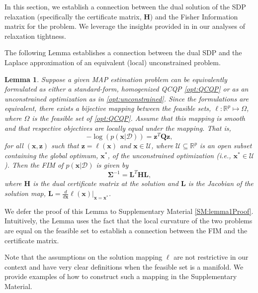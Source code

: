 \documentclass[lettersize,journal]{IEEEtran}
\newtheorem{lemma}[theorem]{Lemma}
\begin{document}
{In this section, we establish a connection between the dual solution of the SDP relaxation (specifically the certificate matrix, $\bm{H}$) and the Fisher Information matrix for the problem. We leverage the insights provided in \cite{zhangDegeneracyOptimizationbasedState2016} in our analyses of relaxation tightness. 

The following Lemma establishes a connection between the dual SDP and the Laplace approximation of an equivalent (local) unconstrained problem. 

\begin{lemma}\label{thm:FisherInfo}
	Suppose a given MAP estimation problem can be equivalently formulated as either a standard-form, homogenized QCQP \eqref{opt:QCQP} or as an unconstrained optimization as in \eqref{opt:unconstrained}. Since the formulations are equivalent, there exists a bijective mapping between the feasible sets, $\bm{\ell}: \mathbb{R}^p \mapsto \Omega$, where $\Omega$ is the feasible set of \eqref{opt:QCQP}. Assume that this mapping is smooth and that respective objectives are locally equal under the mapping. That is,
	\begin{equation}
		-\log\left(p(\bm{x} \vert \bm{\mathcal{D}})\right) = \bm{z}^T \bm{Q} \bm{z},
	\end{equation}
	for all $(\bm{x}, \bm{z})$ such that $\bm{z}=\mathbb{\ell}(\bm{x})$ and $\bm{x} \in \mathcal{U}$, where $\mathcal{U} \subseteq \mathbb{R}^p$ is an open subset containing the global optimum, $\bm{x}^*$, of the unconstrained optimization (i.e., $\bm{x}^* \in \mathcal{U}$). Then the FIM of $p(\bm{x} \vert \bm{\mathcal{D}})$ is given by
	\begin{equation}
		\bm{\Sigma}^{-1}= \bm{L}^T \bm{H}\bm{L},
	\end{equation}
	where $\bm{H}$ is the dual certificate matrix at the solution and $\bm{L}$ is the Jacobian of the solution map, $\bm{L} = \frac{d}{d\bm{x}}\bm{\ell}(\bm{x})\vert_{\bm{x}=\bm{x}^*}$. 
\end{lemma}

We defer the proof of this Lemma to Supplementary Material \ref{SM:lemma1Proof}. Intuitively, the Lemma uses the fact that the local curvature of the two problems are equal on the feasible set to establish a connection between the FIM and the certificate matrix. 

Note that the assumptions on the solution mapping $\bm{\ell}$ are not restrictive in our context and have very clear definitions when the feasible set is a manifold. We provide examples of how to construct such a mapping in the Supplementary Material.

}
\end{document}
